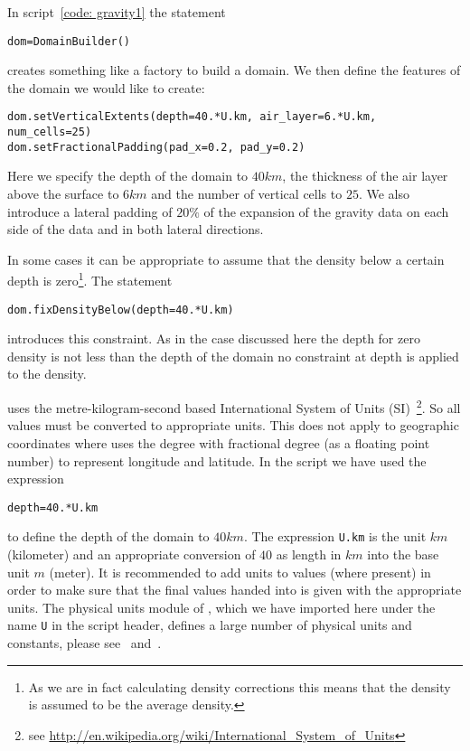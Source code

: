 In script~\ref{code: gravity1} the statement
\begin{verbatim}
dom=DomainBuilder()
\end{verbatim}
creates something like a factory to build a domain.
We then define the features of the domain we would like to create:
\begin{verbatim}
dom.setVerticalExtents(depth=40.*U.km, air_layer=6.*U.km, num_cells=25)
dom.setFractionalPadding(pad_x=0.2, pad_y=0.2)
\end{verbatim}
Here we specify the depth of the domain to $40 km$, the thickness of the air
layer above the surface to $6 km$ and the number of vertical cells to $25$.
We also introduce a lateral padding of $20 \%$ of the expansion of the gravity
data on each side of the data and in both lateral directions.

In some cases it can be appropriate to assume that the density below a certain
depth is zero\footnote{As we are in fact calculating density corrections this
means that the density is assumed to be the average density.}.
The statement 
\begin{verbatim}
dom.fixDensityBelow(depth=40.*U.km)
\end{verbatim}
introduces this constraint.
As in the case discussed here the depth for zero density is not less than the
depth of the domain no constraint at depth is applied to the density.

\downunder uses the metre-kilogram-second based International System of Units
(SI)~\footnote{see \url{http://en.wikipedia.org/wiki/International_System_of_Units}}.
So all values must be converted to appropriate units.
This does not apply to geographic coordinates where \downunder uses the degree
with fractional degree (as a floating point number) to represent longitude and
latitude. In the script we have used the expression
\begin{verbatim}
depth=40.*U.km
\end{verbatim}
to define the depth of the domain to $40 km$.
The expression \verb|U.km| is the unit $km$ (kilometer) and an appropriate
conversion of $40$ as length in $km$ into the base unit $m$ (meter).
It is recommended to add units to values (where present) in order to make sure
that the final values handed into \downunder is given with the appropriate
units.
The physical units module of \escript, which we have imported here under the
name \verb|U| in the script header, defines a large number of physical units
and constants, please see~\cite{ESCRIPT} and~\cite{ESCRIPTONLINE}. 

